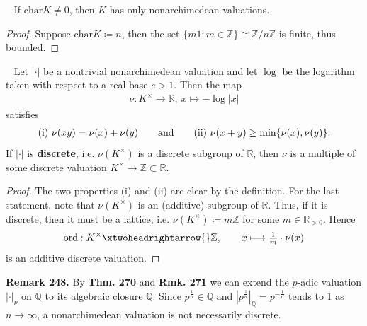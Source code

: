 \documentclass[12pt,a4paper,footinclude=true,headinclude=true]{scrbook} %
\newenvironment{proposition}[2][]
{\renewcommand\theinnercustomprop{#2}\innercustomprop[#1] 
\begin{mdframed}[backgroundcolor=gray!20]\ }
{\end{mdframed}\endinnercustomprop}
\newenvironment{corollary}[2][]
{\renewcommand\theinnercustomcol{#2}\innercustomcol[#1]
\begin{mdframed}[backgroundcolor=gray!20]\ }
{\end{mdframed}\endinnercustomcol}
\newenvironment{remark}[2][Remark]
    { \begin{mdframed}[backgroundcolor=gray!20] \textbf{#1 #2.} }
    {  \end{mdframed}}
\begin{document}
\begin{corollary}{246}
    If $\mathrm{char}K\neq0$, then $K$ has only nonarchimedean valuations.
\end{corollary}
\begin{proof}
    Suppose $\mathrm{char}K\coloneqq n$, then the set  $\{m1:m\in\mathbb{Z}\}\cong\mathbb{Z}/n\mathbb{Z}$ is finite, thus bounded. 
\end{proof}
\newpage
\begin{proposition}{247}
    Let $|\cdot|$ be a nontrivial nonarchimedean valuation and let $\log$ be the logarithm taken with respect to a real base $e>1$. Then the map 
    \begin{align*}
        \nu:K^\times\longrightarrow\mathbb{R},\ x\mapsto-\log|x|
    \end{align*}
    satisfies
    \begin{align*}
        \text{(i)}\ \nu(xy)=\nu(x)+\nu(y)\qquad \text{and\qquad (ii)}\ \nu(x+y)\geq\mathrm{min}\{\nu(x),\nu(y)\}.
    \end{align*}
    If $|\cdot|$ is \textbf{discrete}, i.e. $\nu(K^\times)$ is a discrete subgroup of $\mathbb{R}$, then $\nu$ is a multiple of some discrete valuation $K^\times\to\mathbb{Z}\subset\mathbb{R}$.
\end{proposition}
\begin{proof}
    The two properties (i) and (ii) are clear by the definition. For the last statement, note that $\nu(K^\times)$ is an (additive) subgroup of $\mathbb{R}$. Thus, if it is discrete, then it must be a lattice, i.e. $\nu(K^\times)\coloneqq m\mathbb{Z}$ for some $m\in\mathbb{R}_{>0}$. Hence
    \begin{align*}
        \mathrm{ord}:K^\times\xtwoheadrightarrow{} \mathbb{Z},\qquad x\longmapsto\tfrac{1}{m}\cdot\nu(x)
    \end{align*}
    is an additive discrete valuation.
\end{proof}

\begin{remark}{248}
    By \textbf{Thm. 270} and \textbf{Rmk. 271} we can extend the $p$-adic valuation $|\cdot|_p$ on $\mathbb{Q}$ to its algebraic closure $\overline{\mathbb{Q}}$. Since $p^{\frac{1}{n}}\in\overline{\mathbb{Q}}$ and $|p^{\frac{1}{n}}|_{\mathbb{Q}}=p^{-\frac{1}{n}}$ tends to $1$ as $n\to\infty$, a nonarchimedean valuation is not necessarily discrete.
\end{remark}
\end{document}
